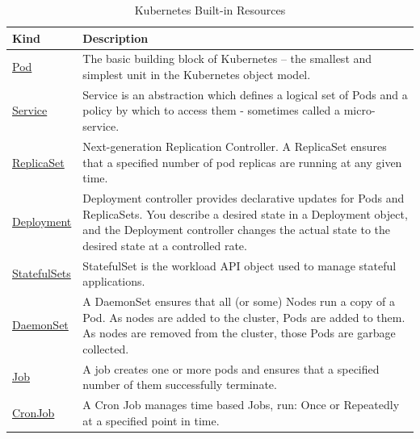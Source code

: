 \begin{table}[H]
\centering
    \begin{tabular}{ | l | p{12cm} |}
    \hline
    Kind & Description \\ \hline
    \href{https://kubernetes.io/docs/concepts/workloads/pods/pod-overview/}{Pod} & The basic building block of Kubernetes -- the smallest and simplest unit in the Kubernetes object model. \\ \hline
    \href{https://kubernetes.io/docs/concepts/services-networking/service/}{Service} & Service is an abstraction which defines a logical set of Pods and a policy by which to access them - sometimes called a micro-service. \\ \hline
    \href{https://kubernetes.io/docs/concepts/workloads/controllers/replicaset/}{ReplicaSet} & Next-generation Replication Controller. A ReplicaSet ensures that a specified number of pod replicas are running at any given time. \\ \hline
    \href{https://kubernetes.io/docs/concepts/workloads/controllers/deployment/}{Deployment} & Deployment controller provides declarative updates for Pods and ReplicaSets. You describe a desired state in a Deployment object, and the Deployment controller changes the actual state to the desired state at a controlled rate. \\ \hline
    \href{https://kubernetes.io/docs/concepts/workloads/controllers/statefulset/}{StatefulSets} & StatefulSet is the workload API object used to manage stateful applications. \\ \hline
    \href{https://kubernetes.io/docs/concepts/workloads/controllers/daemonset/}{DaemonSet} & A DaemonSet ensures that all (or some) Nodes run a copy of a Pod. As nodes are added to the cluster, Pods are added to them. As nodes are removed from the cluster, those Pods are garbage collected. \\ \hline
    \href{https://kubernetes.io/docs/concepts/workloads/controllers/jobs-run-to-completion/}{Job} & A job creates one or more pods and ensures that a specified number of them successfully terminate. \\ \hline
    \href{https://kubernetes.io/docs/concepts/workloads/controllers/cron-jobs/}{CronJob} & A Cron Job manages time based Jobs, run: Once or Repeatedly at a specified point in time. \\
    \hline
    \end{tabular}
\caption{Kubernetes Built-in Resources}
\label{kubeBuiltinResources}
\end{table}

